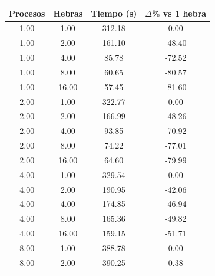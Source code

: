 \begin{table}[ht]
    \centering
    \begin{tabular}{|c|c|c|c|}
        \hline
        \textbf{Procesos} & \textbf{Hebras} & \textbf{Tiempo (s)} & \textbf{$\Delta$\% vs 1 hebra} \\
        \hline
        1.00              & 1.00            & 312.18              & 0.00                           \\
        1.00              & 2.00            & 161.10              & -48.40                         \\
        1.00              & 4.00            & 85.78               & -72.52                         \\
        1.00              & 8.00            & 60.65               & -80.57                         \\
        1.00              & 16.00           & 57.45               & -81.60                         \\
        2.00              & 1.00            & 322.77              & 0.00                           \\
        2.00              & 2.00            & 166.99              & -48.26                         \\
        2.00              & 4.00            & 93.85               & -70.92                         \\
        2.00              & 8.00            & 74.22               & -77.01                         \\
        2.00              & 16.00           & 64.60               & -79.99                         \\
        4.00              & 1.00            & 329.54              & 0.00                           \\
        4.00              & 2.00            & 190.95              & -42.06                         \\
        4.00              & 4.00            & 174.85              & -46.94                         \\
        4.00              & 8.00            & 165.36              & -49.82                         \\
        4.00              & 16.00           & 159.15              & -51.71                         \\
        8.00              & 1.00            & 388.78              & 0.00                           \\
        8.00              & 2.00            & 390.25              & 0.38                           \\

\end{tabular}
\end{table}

